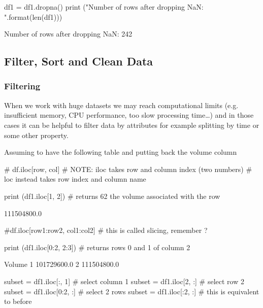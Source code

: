 \begin{ipython}
df1 = df1.dropna()
print ("Number of rows after dropping NaN: {}".format(len(df1)))
\end{ipython}
\begin{ioutput}
Number of rows after dropping NaN: 242
\end{ioutput}

\subsection{Filter, Sort and Clean Data}
\label{filter-sort-and-clean-data}

\subsubsection{Filtering}\label{filtering}

When we work with huge datasets we may reach computational limits (e.g. insufficient memory, CPU performance, too slow processing time\ldots) and in those cases it can be helpful to filter data by attributes for example splitting by time or some other property.

Assuming to have the following table and putting back the volume column

\begin{ipython}
# df.iloc[row, col]
# NOTE: iloc takes row and column index (two numbers)
# loc instead takes row index and column name

print (df1.iloc[1, 2]) # returns 62 the volume associated with the row
\end{ipython}
\begin{ioutput}
111504800.0
\end{ioutput}

\begin{ipython}
#df.iloc[row1:row2, col1:col2]
# this is called slicing, remember ?

print (df1.iloc[0:2, 2:3]) # returns rows 0 and 1 of column 2
\end{ipython}
\begin{ioutput}
        Volume
1  101729600.0
2  111504800.0
\end{ioutput}

\begin{ipython}
subset = df1.iloc[:, 1] # select column 1
subset = df1.iloc[2, :] # select row 2
subset = df1.iloc[0:2, :] # select 2 rows
subset = df1.iloc[:2, :] # this is equivalent to before
\end{ipython}

